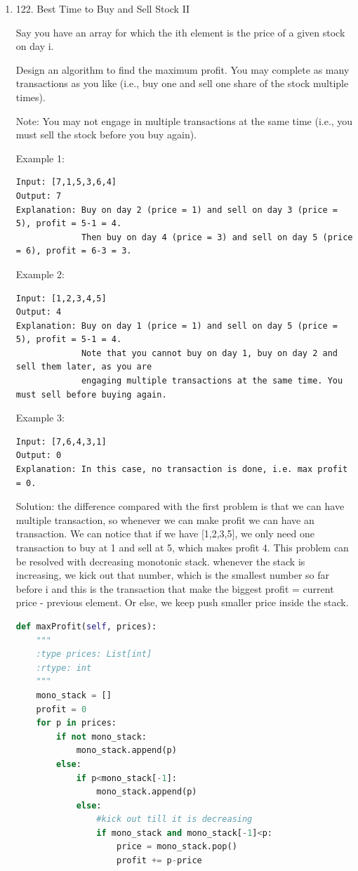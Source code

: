 \documentclass[../main.tex]{subfiles}
\begin{document}
\begin{enumerate}
\item 122. Best Time to Buy and Sell Stock II

Say you have an array for which the ith element is the price of a given stock on day i.

Design an algorithm to find the maximum profit. You may complete as many transactions as you like (i.e., buy one and sell one share of the stock multiple times).

Note: You may not engage in multiple transactions at the same time (i.e., you must sell the stock before you buy again).

Example 1:
\begin{lstlisting}
Input: [7,1,5,3,6,4]
Output: 7
Explanation: Buy on day 2 (price = 1) and sell on day 3 (price = 5), profit = 5-1 = 4.
             Then buy on day 4 (price = 3) and sell on day 5 (price = 6), profit = 6-3 = 3.
\end{lstlisting}
Example 2:
\begin{lstlisting}
Input: [1,2,3,4,5]
Output: 4
Explanation: Buy on day 1 (price = 1) and sell on day 5 (price = 5), profit = 5-1 = 4.
             Note that you cannot buy on day 1, buy on day 2 and sell them later, as you are
             engaging multiple transactions at the same time. You must sell before buying again.
\end{lstlisting}
Example 3:
\begin{lstlisting}
Input: [7,6,4,3,1]
Output: 0
Explanation: In this case, no transaction is done, i.e. max profit = 0.
\end{lstlisting}
Solution: the difference compared with the first problem is that we can have multiple transaction, so whenever we can make profit we can have an transaction. We can notice that if we have [1,2,3,5], we only need one transaction to buy at 1 and sell at 5, which makes profit 4.  This problem can be resolved with decreasing monotonic stack.  whenever the stack is increasing, we kick out that number, which is the smallest number so far before i and this is the transaction that make the biggest profit = current price - previous element. Or else, we keep push smaller price inside the stack. 
\begin{lstlisting}[language = Python]
def maxProfit(self, prices):
    """
    :type prices: List[int]
    :rtype: int
    """
    mono_stack = []
    profit = 0
    for p in prices:
        if not mono_stack:
            mono_stack.append(p)
        else:
            if p<mono_stack[-1]:
                mono_stack.append(p)
            else:
                #kick out till it is decreasing
                if mono_stack and mono_stack[-1]<p:
                    price = mono_stack.pop()
                    profit += p-price


\end{lstlisting}
\end{enumerate}
\end{document}
